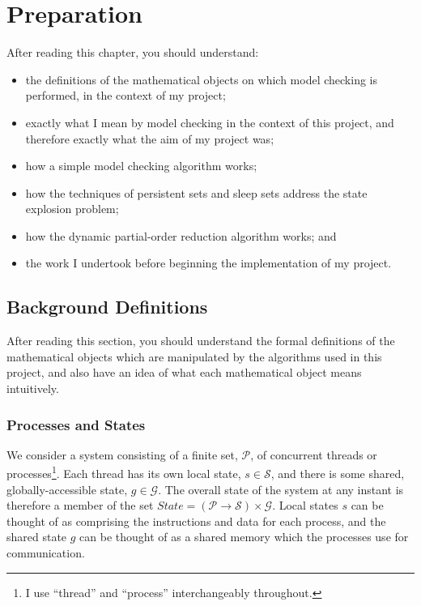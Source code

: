 \documentclass[12pt,a4paper,twoside,openright]{report}
\newenvironment{understandinglist}
	{\begin{itemize} \itemsep 0em}{\end{itemize}}
\begin{document}
\chapter{Preparation}
\label{cha:prep}
After reading this chapter,
you should understand:
\begin{understandinglist}
	\item the definitions of the
	mathematical objects on which model
	checking is performed, in the context
	of my project;
	\item exactly what I mean by model checking
	in the context of this project, and therefore
	exactly what the aim of my project was;
	\item how a simple model checking algorithm
	works;
	\item how the techniques of persistent sets
	and sleep sets address the state explosion
	problem;
	\item how the dynamic partial-order
	reduction algorithm works; and
	\item the work I undertook before beginning
	the implementation of my project.
\end{understandinglist}

\section{Background Definitions} \label{sec:background-defs}
After reading this section, you should understand the
formal definitions of the mathematical objects
which are manipulated by the algorithms used in
this project, and also have an idea of
what each mathematical object means intuitively.

\subsection{Processes and States}
We consider a system consisting of a finite set, $\mathcal{P}$,
of concurrent threads or processes\footnote{I use ``thread'' and
``process'' interchangeably throughout.}.
Each thread has its own local state, $s \in \mathcal{S}$, and there
is some shared, globally-accessible state, $g \in \mathcal{G}$. The overall
state of the system at any instant is therefore a member of the set
$ \textit{State} = (\mathcal{P} \to \mathcal{S}) \times \mathcal{G} $.
Local states $s$ can be thought of as comprising the instructions
and data for each process, and the shared state $g$ can be thought
of as a shared memory which the processes use for communication.
\end{document}
